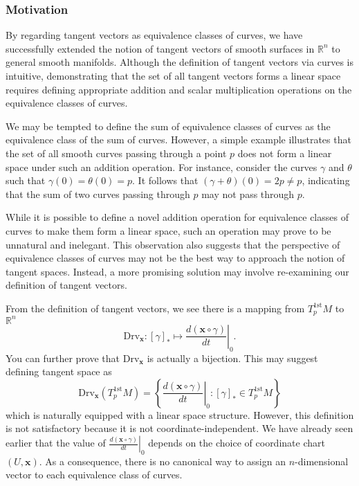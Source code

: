 \documentclass{report}
\begin{document}
\subsubsection{Motivation}
By regarding tangent vectors as equivalence classes of curves, we have successfully extended the notion of tangent vectors of smooth surfaces in $\mathbb{R}^n$ to general smooth manifolds. Although the definition of tangent vectors via curves is intuitive, demonstrating that the set of all tangent vectors forms a linear space requires defining appropriate addition and scalar multiplication operations on the equivalence classes of curves. 

We may be tempted to define the sum of equivalence classes of curves as the equivalence class of the sum of curves. However, a simple example illustrates that the set of all smooth curves passing through a point $p$ does not form a linear space under such an addition operation. For instance, consider the curves $\gamma$ and $\theta$ such that $\gamma(0)=\theta(0)=p$. It follows that $(\gamma+\theta)(0)=2p\neq p$, indicating that the sum of two curves passing through $p$ may not pass through $p$.

While it is possible to define a novel addition operation for equivalence classes of curves to make them form a linear space, such an operation may prove to be unnatural and inelegant. This observation also suggests that the perspective of equivalence classes of curves may not be the best way to approach the notion of tangent spaces. Instead, a more promising solution may involve re-examining our definition of tangent vectors.

From the definition of tangent vectors, we see there is a mapping from $T_p^{1\mathrm{st}}M$ to $\mathbb{R}^n$
\[
    \mathrm{Drv}_{\mathbf{x}}:[\gamma]_*\longmapsto\left.\frac{d(\mathbf{x} \circ \gamma)}{dt}\right|_0.
\]
You can further prove that $\mathrm{Drv}_{\mathbf{x}}$ is actually a bijection. This may suggest defining tangent space as
\[
    \mathrm{Drv}_{\mathbf{x}}\left(T_p^{1\mathrm{st}}M\right)=\left\{\left.\frac{d(\mathbf{x} \circ \gamma)}{dt}\right|_0: [\gamma]_*\in T_p^{1\mathrm{st}}M \right\}
\]
which is naturally equipped with a linear space structure. However, this definition is not satisfactory because it is not coordinate-independent. We have already seen earlier that the value of $\left.\frac{d(\mathbf{x} \circ \gamma)}{dt}\right|_0$ depends on the choice of coordinate chart $(U,\mathbf{x})$. As a consequence,  there is no canonical way to assign an $n$-dimensional vector to each equivalence class of curves. 
\end{document}
